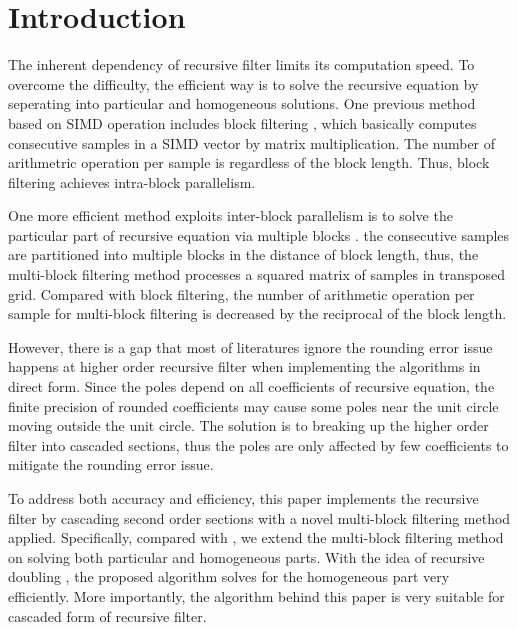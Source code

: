 \section{Introduction}
\label{sec:introduction}

The inherent dependency of recursive filter limits its computation speed.
To overcome the difficulty, the efficient way is to solve the recursive equation by seperating into
particular and homogeneous solutions.
One previous method based on SIMD operation includes block filtering \cite{Sung_86}, 
which basically computes consecutive samples in a SIMD vector by matrix multiplication. 
The number of arithmetric operation per sample is regardless of the block length. Thus, block filtering achieves
intra-block parallelism. 

One more efficient method exploits inter-block parallelism is to solve the particular part of recursive equation via multiple blocks \cite{Jaewoo_09}.
the consecutive samples are partitioned into multiple blocks in the distance of block length, thus, the multi-block filtering method
processes a squared matrix of samples in transposed grid. Compared with block filtering, the number of arithmetic operation per sample for multi-block filtering is decreased 
by the reciprocal of the block length.

However, there is a gap that most of literatures ignore the rounding error issue happens at higher order recursive filter when implementing the algorithms in direct form.
Since the poles depend on all coefficients of recursive equation, the finite precision of rounded coefficients may cause some poles near the unit circle
moving outside the unit circle. The solution is to breaking up the higher order filter into cascaded sections, thus the poles are only affected by few coefficients to mitigate
the rounding error issue.

To address both accuracy and efficiency, this paper implements the recursive filter by cascading second order sections with a novel multi-block filtering method applied.
Specifically, compared with \cite{Jaewoo_09}, we extend the multi-block filtering method on solving both particular and homogeneous parts. With the idea of recursive doubling \cite{Kogge_73},
the proposed algorithm solves for the homogeneous part very efficiently. More importantly, the algorithm behind this paper is very suitable for cascaded form of recursive filter.


